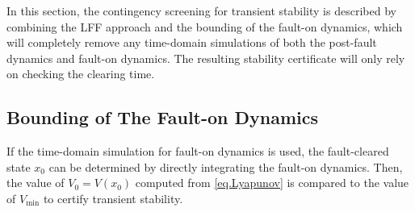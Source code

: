 \documentclass[final]{IEEEtran}
\begin{document}
In this section, the contingency screening for
transient stability is described  by combining the LFF approach and the bounding
of the fault-on dynamics, which will completely remove any
time-domain simulations of both the post-fault dynamics and fault-on dynamics. The resulting stability certificate will only rely on checking the clearing
time.

\subsection{Bounding of The Fault-on Dynamics}

If the time-domain simulation for fault-on dynamics is used, the fault-cleared 
state $x_0$ can be determined by directly
integrating the fault-on dynamics. Then, the value of $V_0 =
V(x_0)$ computed from \eqref{eq.Lyapunov} is compared to
the value of $V_{\min}$ to certify transient stability.
\end{document}
